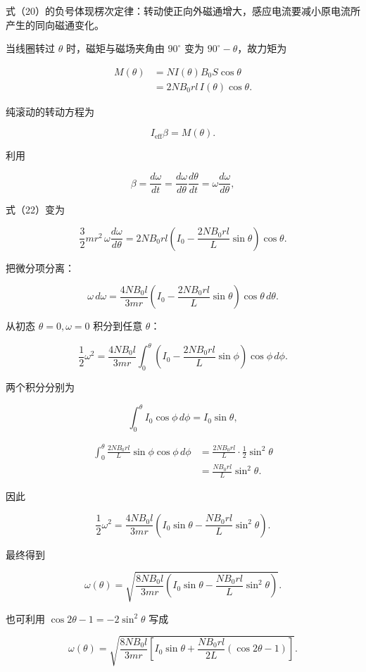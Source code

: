 \documentclass[12pt,a4paper,UTF8]{ctexart}
\begin{document}
式（20）的负号体现楞次定律：转动使正向外磁通增大，感应电流要减小原电流所产生的同向磁通变化。

当线圈转过 \(\theta\) 时，磁矩与磁场夹角由 \(90^\circ\) 变为
\(90^\circ-\theta\)，故力矩为

\[
\begin{aligned}
M(\theta)
&=N I(\theta)B_0S\cos\theta\\
&=2NB_0rl\,I(\theta)\cos\theta.
\end{aligned} \tag{21}
\]

纯滚动的转动方程为

\[
I_{\mathrm{eff}}\beta=M(\theta). \tag{22}
\]

利用

\[
\beta=\frac{d\omega}{dt}
=\frac{d\omega}{d\theta}\frac{d\theta}{dt}
=\omega\frac{d\omega}{d\theta}, \tag{23}
\]

式（22）变为

\[
\frac32mr^2\,\omega\frac{d\omega}{d\theta}
=2NB_0rl\left(I_0-\frac{2NB_0rl}{L}\sin\theta\right)\cos\theta. \tag{24}
\]

把微分项分离：

\[
\omega\,d\omega
=\frac{4NB_0l}{3mr}
\left(I_0-\frac{2NB_0rl}{L}\sin\theta\right)
\cos\theta\,d\theta. \tag{25}
\]

从初态 \(\theta=0,\omega=0\) 积分到任意 \(\theta\)：

\[
\frac12\omega^2
=\frac{4NB_0l}{3mr}
\int_0^\theta
\left(I_0-\frac{2NB_0rl}{L}\sin\phi\right)
\cos\phi\,d\phi. \tag{26}
\]

两个积分分别为

\[
\int_0^\theta I_0\cos\phi\,d\phi
=I_0\sin\theta, \tag{27}
\]

\[
\begin{aligned}
\int_0^\theta
\frac{2NB_0rl}{L}\sin\phi\cos\phi\,d\phi
&=\frac{2NB_0rl}{L}\cdot\frac12\sin^2\theta\\
&=\frac{NB_0rl}{L}\sin^2\theta.
\end{aligned} \tag{28}
\]

因此

\[
\frac12\omega^2
=\frac{4NB_0l}{3mr}
\left(
I_0\sin\theta-\frac{NB_0rl}{L}\sin^2\theta
\right). \tag{29}
\]

最终得到

\[
\boxed{
\omega(\theta)
=\sqrt{
\frac{8NB_0l}{3mr}
\left(
I_0\sin\theta-\frac{NB_0rl}{L}\sin^2\theta
\right)
}
}. \tag{30}
\]

也可利用 \(\cos2\theta-1=-2\sin^2\theta\) 写成

\[
\omega(\theta)
=\sqrt{
\frac{8NB_0l}{3mr}
\left[
I_0\sin\theta
+\frac{NB_0rl}{2L}(\cos2\theta-1)
\right]
}. \tag{31}
\]
\end{document}

